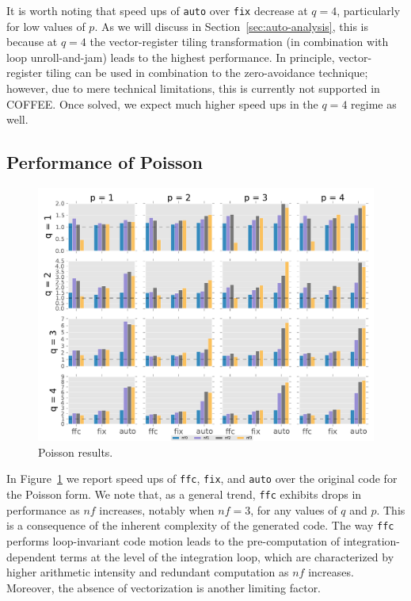 It is worth noting that speed ups of \texttt{auto} over \texttt{fix} decrease at $q=4$, particularly for low values of $p$. As we will discuss in Section~\ref{sec:auto-analysis}, this is because at $q=4$ the vector-register tiling transformation (in combination with loop unroll-and-jam) leads to the highest performance. In principle, vector-register tiling can be used in combination to the zero-avoidance technique; however, due to mere technical limitations, this is currently not supported in COFFEE. Once solved, we expect much higher speed ups in the $q=4$ regime as well.


\subsection{Performance of Poisson}
\begin{figure}[t]
\centerline{\includegraphics[scale=0.7]{coffee/perf-results/allforms/poisson}}
\caption{Poisson results.}\label{fig:coffee-allforms-poisson}
\end{figure}

In Figure~\ref{fig:coffee-allforms-poisson} we report speed ups of \texttt{ffc}, \texttt{fix}, and \texttt{auto} over the original code for the Poisson form. We note that, as a general trend, \texttt{ffc} exhibits drops in performance as $nf$ increases, notably when $nf=3$, for any values of $q$ and $p$. This is a consequence of the inherent complexity of the generated code. The way \texttt{ffc} performs loop-invariant code motion leads to the pre-computation of integration-dependent terms at the level of the integration loop, which are characterized by higher arithmetic intensity and redundant computation as $nf$ increases. Moreover, the absence of vectorization is another limiting factor.


